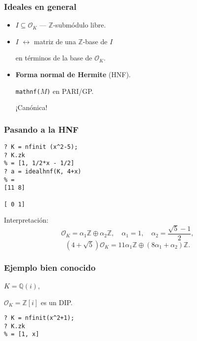 \documentclass{beamer}
\newcommand{\ZZ}{\mathbb{Z}}
\newcommand{\QQ}{\mathbb{Q}}
\renewcommand{\O}{\mathcal{O}}
\begin{document}
\begin{frame}
  \frametitle{Ideales en general}

  \begin{itemize}
  \item $I \subseteq \O_K$ --- $\ZZ$-submódulo libre.

  \item $I$ $\longleftrightarrow$ matriz de una $\ZZ$-base de $I$

    en términos de la base de $\O_K$.

  \item \textbf{Forma normal de Hermite} (HNF).

    \texttt{mathnf($M$)} en PARI/GP.

    ¡Canónica!
  \end{itemize}

\end{frame}


\begin{frame}[fragile]
  \frametitle{Pasando a la HNF}

  \begin{shaded}\small
\begin{verbatim}
? K = nfinit (x^2-5);
? K.zk
% = [1, 1/2*x - 1/2]
? a = idealhnf(K, 4+x)
% =
[11 8]

[ 0 1]
\end{verbatim}
  \end{shaded}

  Interpretación:
  \[ \O_K = \alpha_1\ZZ \oplus \alpha_2\ZZ, \quad
     \alpha_1 = 1, \quad
     \alpha_2 = \frac{\sqrt{5} - 1}{2}, \]
  $$(4 + \sqrt{5})\O_K = 11\alpha_1\ZZ \oplus (8\alpha_1 + \alpha_2)\ZZ.$$
\end{frame}


\begin{frame}[fragile]
  \frametitle{Ejemplo bien conocido}

  $K = \QQ (i)$,

  $\O_K = \ZZ[i]$ es un DIP.

  \begin{shaded}\small
\begin{verbatim}
? K = nfinit(x^2+1);
? K.zk
% = [1, x]
\end{verbatim}
  \end{shaded}
\end{frame}
\end{document}
